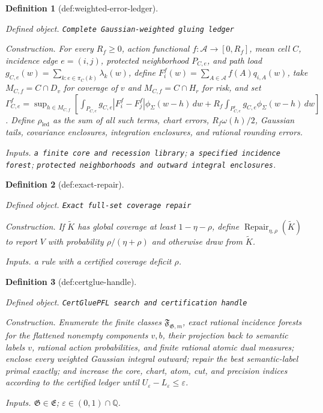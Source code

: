 \documentclass{article}
\newtheorem{definition}{Definition}
\begin{document}
\begin{definition}[def:weighted-error-ledger]\label{def:weighted-error-ledger}
\par\smallskip\noindent\emph{Defined object.} \texttt{Complete Gaussian-\allowbreak{}weighted gluing ledger}
\par\smallskip\noindent\emph{Construction.} For every \(R_f\ge0\), action functional \(f:\mathcal A\to[0,R_f]\), mean cell \(C\), incidence edge \(e=(i,j)\), protected neighborhood \(P_{C,e}\), and path load \(g_{C,e}(w)=\sum_{k:e\in\pi_C(k)}\lambda_k(w)\), define \(F_i^f(w)=\sum_{A\in\mathcal A}f(A)q_{i,A}(w)\), take \(M_{C,f}=C\cap D_v\) for coverage of \(v\) and \(M_{C,f}=C\cap H_r\) for risk, and set \(\Gamma_{C,e}^f=\sup_{h\in M_{C,f}}[\int_{P_{C,e}}g_{C,e}|F_i^f-F_j^f|\phi_{\Sigma}(w-h)\,dw+R_f\int_{P_{C,e}^{c}}g_{C,e}\phi_{\Sigma}(w-h)\,dw]\). Define \(\rho_{\mathrm{led}}\) as the sum of all such terms, chart errors, \(R_f\omega(h)/2\), Gaussian tails, covariance enclosures, integration enclosures, and rational rounding errors.
\par\smallskip\noindent\emph{Inputs.} \texttt{a finite core and recession library}; \texttt{a specified incidence forest}; \texttt{protected neighborhoods and outward integral enclosures}.
\end{definition}

\begin{definition}[def:exact-repair]\label{def:exact-repair}
\par\smallskip\noindent\emph{Defined object.} \texttt{Exact full-\allowbreak{}set coverage repair}
\par\smallskip\noindent\emph{Construction.} If \(\widetilde K\) has global coverage at least \(1-\eta-\rho\), define \(\operatorname{Repair}_{\eta,\rho}(\widetilde K)\) to report \(V\) with probability \(\rho/(\eta+\rho)\) and otherwise draw from \(\widetilde K\).
\par\smallskip\noindent\emph{Inputs.} a rule with a certified coverage deficit \(\rho\).
\end{definition}

\begin{definition}[def:certglue-handle]\label{def:certglue-handle}
\par\smallskip\noindent\emph{Defined object.} \texttt{CertGluePFL search and certification handle}
\par\smallskip\noindent\emph{Construction.} Enumerate the finite classes \(\mathfrak F_{\mathfrak G,m}\), exact rational incidence forests for the flattened nonempty components \(v,b\), their projection back to semantic labels \(v\), rational action probabilities, and finite rational atomic dual measures; enclose every weighted Gaussian integral outward; repair the best semantic-label primal exactly; and increase the core, chart, atom, cut, and precision indices according to the certified ledger until \(U_{\varepsilon}-L_{\varepsilon}\le\varepsilon\).
\par\smallskip\noindent\emph{Inputs.} \(\mathfrak G\in\mathfrak E\); \(\varepsilon\in(0,1)\cap\mathbb Q\).
\end{definition}
\end{document}
